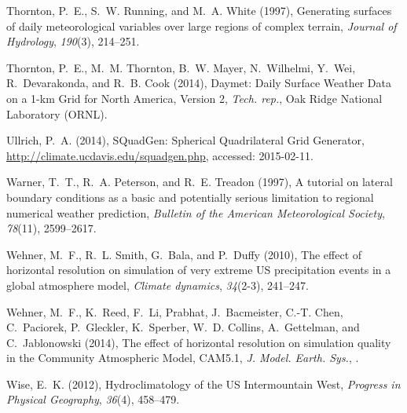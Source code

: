\documentclass[ms]{agutex}   %
\begin{document}
\begin{article}
\begin{thebibliography}{84}
Thornton, P.~E., S.~W. Running, and M.~A. White (1997), Generating surfaces of
  daily meteorological variables over large regions of complex terrain,
  \textit{Journal of Hydrology}, \textit{190}(3), 214--251.

Thornton, P.~E., M.~M. Thornton, B.~W. Mayer, N.~Wilhelmi, Y.~Wei,
  R.~Devarakonda, and R.~B. Cook (2014), {Daymet: Daily Surface Weather Data on
  a 1-km Grid for North America, Version 2}, \textit{Tech. rep.}, Oak Ridge
  National Laboratory (ORNL).

Ullrich, P.~A. (2014), {SQuadGen: Spherical Quadrilateral Grid Generator},
  \url{http://climate.ucdavis.edu/squadgen.php}, accessed: 2015-02-11.

Warner, T.~T., R.~A. Peterson, and R.~E. Treadon (1997), A tutorial on lateral
  boundary conditions as a basic and potentially serious limitation to regional
  numerical weather prediction, \textit{Bulletin of the American Meteorological
  Society}, \textit{78}(11), 2599--2617.

Wehner, M.~F., R.~L. Smith, G.~Bala, and P.~Duffy (2010), {The effect of
  horizontal resolution on simulation of very extreme US precipitation events
  in a global atmosphere model}, \textit{Climate dynamics}, \textit{34}(2-3),
  241--247.

Wehner, M.~F., K.~Reed, F.~Li, Prabhat, J.~Bacmeister, C.-T. Chen, C.~Paciorek,
  P.~Gleckler, K.~Sperber, W.~D. Collins, A.~Gettelman, and C.~Jablonowski
  (2014), {The effect of horizontal resolution on simulation quality in the
  Community Atmospheric Model, CAM5.1}, \textit{J. Model. Earth. Sys.},
  .

Wise, E.~K. (2012), {Hydroclimatology of the US Intermountain West},
  \textit{Progress in Physical Geography}, \textit{36}(4), 458--479.


\end{thebibliography}
\end{article}
\end{document}
